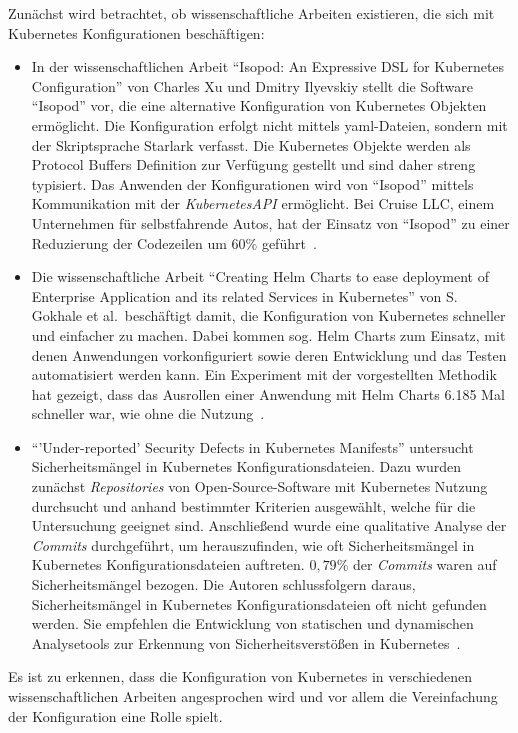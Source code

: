 Zunächst wird betrachtet, ob wissenschaftliche Arbeiten existieren, die sich mit Kubernetes Konfigurationen beschäftigen:
\begin{itemize}
    \item In der wissenschaftlichen Arbeit ``Isopod: An Expressive DSL for Kubernetes Configuration'' von Charles Xu und Dmitry Ilyevskiy stellt die
          Software ``Isopod'' vor, die eine alternative Konfiguration von Kubernetes Objekten ermöglicht. Die Konfiguration erfolgt nicht mittels \ac{yaml}-Dateien,
          sondern mit der Skriptsprache Starlark verfasst. Die Kubernetes Objekte werden als Protocol Buffers Definition zur Verfügung gestellt und sind daher streng typisiert.
          Das Anwenden der Konfigurationen wird von ``Isopod'' mittels Kommunikation mit der \textit{KubernetesAPI} ermöglicht.
          Bei Cruise LLC, einem Unternehmen für selbstfahrende Autos, hat der Einsatz von ``Isopod'' zu einer Reduzierung der Codezeilen um $60\%$ geführt~\cite{10.1145/3357223.3365759}.
    \item Die wissenschaftliche Arbeit ``Creating Helm Charts to ease deployment of Enterprise Application and its related Services in Kubernetes'' von
          S. Gokhale et al.\ beschäftigt damit, die Konfiguration von Kubernetes schneller und einfacher zu machen. Dabei kommen sog. Helm Charts zum Einsatz,
          mit denen Anwendungen vorkonfiguriert sowie deren Entwicklung und das Testen automatisiert werden kann. Ein Experiment mit der vorgestellten Methodik
          hat gezeigt, dass das Ausrollen einer Anwendung mit Helm Charts 6.185 Mal schneller war, wie ohne die Nutzung~\cite{9776450}.
    \item ``'Under-reported' Security Defects in Kubernetes Manifests'' untersucht Sicherheitsmängel in Kubernetes Konfigurationsdateien.
          Dazu wurden zunächst \textit{Repositories} von Open-Source-Software mit Kubernetes Nutzung durchsucht und anhand bestimmter Kriterien ausgewählt, welche für
          die Untersuchung geeignet sind. Anschließend wurde eine qualitative Analyse der \textit{Commits} durchgeführt, um herauszufinden, wie oft Sicherheitsmängel in Kubernetes
          Konfigurationsdateien auftreten. $0,79\%$ der \textit{Commits} waren auf Sicherheitsmängel bezogen. Die Autoren schlussfolgern daraus,
          Sicherheitsmängel in Kubernetes Konfigurationsdateien oft nicht gefunden werden. Sie empfehlen die Entwicklung von statischen und dynamischen Analysetools
          zur Erkennung von Sicherheitsverstößen in Kubernetes~\cite{9476056}.
\end{itemize}

Es ist zu erkennen, dass die Konfiguration von Kubernetes in verschiedenen wissenschaftlichen Arbeiten angesprochen wird und vor allem die Vereinfachung
der Konfiguration eine Rolle spielt.

